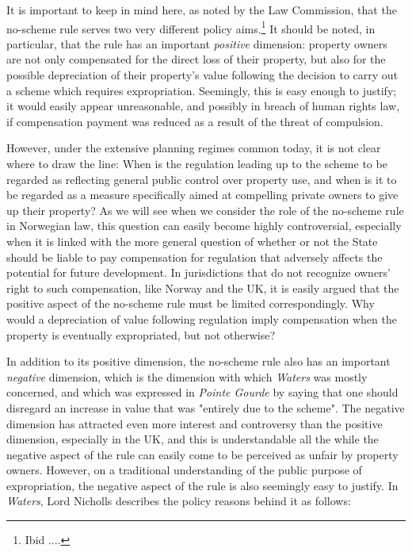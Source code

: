 It is important to keep in mind here, as noted by the Law Commission, that the no-scheme rule serves two very different policy aims.\footnote{Ibid ....} It should be noted, in particular, that the rule has an important \emph{positive} dimension: property owners are not only compensated for the direct loss of their property, but also for the possible depreciation of their property's value following the decision to carry out a scheme which requires expropriation. Seemingly, this is easy enough to justify; it would easily appear unreasonable, and possibly in breach of human rights law, if compensation payment was reduced as a result of the threat of compulsion.

However, under the extensive planning regimes common today, it is not clear where to draw the line: When is the regulation leading up to the scheme to be regarded as reflecting general public control over property use, and when is it to be regarded as a measure specifically aimed at compelling private owners to give up their property? As we will see when we consider the role of the no-scheme rule in Norwegian law, this question can easily become highly controversial, especially when it is linked with the more general question of whether or not the State should be liable to pay compensation for regulation that adversely affects the potential for future development. In jurisdictions that do not recognize owners' right to such compensation, like Norway and the UK, it is easily argued that the positive aspect of the no-scheme rule must be limited correspondingly. Why would a depreciation of value following regulation imply compensation when the property is eventually expropriated, but not otherwise?

In addition to its positive dimension, the no-scheme rule also has an important \emph{negative} dimension, which is the dimension with which \emph{Waters} was mostly concerned, and which was expressed in \emph{Pointe Gourde} by saying that one should disregard an increase in value that was "entirely due to the scheme". The negative dimension has attracted even more interest and controversy than the positive dimension, especially in the UK, and this is understandable all the while the negative aspect of the rule can easily come to be perceived as unfair by property owners. However, on a traditional understanding of the public purpose of expropriation, the negative aspect of the rule is also seemingly easy to justify. In \emph{Waters}, Lord Nicholls describes the policy reasons behind it as follows:

